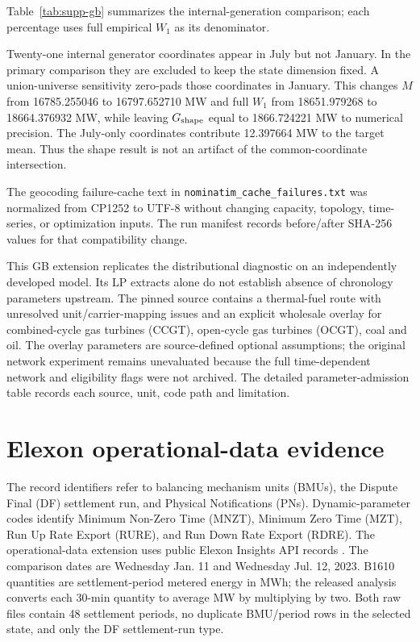 \documentclass[10pt,journal,onecolumn]{IEEEtran}
\begin{document}
Table~\ref{tab:supp-gb} summarizes the internal-generation comparison; each percentage uses full empirical $W_1$ as its denominator.

Twenty-one internal generator coordinates appear in July but not January. In the primary comparison they are excluded to keep the state dimension fixed. A union-universe sensitivity zero-pads those coordinates in January. This changes $M$ from 16785.255046 to 16797.652710 MW and full $W_1$ from 18651.979268 to 18664.376932 MW, while leaving $G_{\rm shape}$ equal to 1866.724221 MW to numerical precision. The July-only coordinates contribute 12.397664 MW to the target mean. Thus the shape result is not an artifact of the common-coordinate intersection.

The geocoding failure-cache text in \texttt{nominatim\_cache\_failures.txt} was normalized from CP1252 to UTF-8 without changing capacity, topology, time-series, or optimization inputs. The run manifest records before/after SHA-256 values for that compatibility change.

This GB extension replicates the distributional diagnostic on an independently developed model. Its LP extracts alone do not establish absence of chronology parameters upstream. The pinned source contains a thermal-fuel route with unresolved unit/carrier-mapping issues and an explicit wholesale overlay for combined-cycle gas turbines (CCGT), open-cycle gas turbines (OCGT), coal and oil. The overlay parameters are source-defined optional assumptions; the original network experiment remains unevaluated because the full time-dependent network and eligibility flags were not archived. The detailed parameter-admission table records each source, unit, code path and limitation.

\FloatBarrier
\section{Elexon operational-data evidence}
The record identifiers refer to balancing mechanism units (BMUs), the Dispute Final (DF) settlement run, and Physical Notifications (PNs). Dynamic-parameter codes identify Minimum Non-Zero Time (MNZT), Minimum Zero Time (MZT), Run Up Rate Export (RURE), and Run Down Rate Export (RDRE).
The operational-data extension uses public Elexon Insights API records \cite{ElexonInsights}. The comparison dates are Wednesday Jan. 11 and Wednesday Jul. 12, 2023. B1610 quantities are settlement-period metered energy in MWh; the released analysis converts each 30-min quantity to average MW by multiplying by two. Both raw files contain 48 settlement periods, no duplicate BMU/period rows in the selected state, and only the DF settlement-run type.
\end{document}
